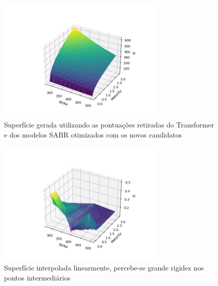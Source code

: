 \begin{figure}
	\begin{center}
		\includegraphics[width=8cm]{resources/pred_surface.png}
		\caption{Superfície gerada utilizando as pontuações retiradas do Transformer e dos modelos SABR otimizados com os novos candidatos}
	\end{center}
\end{figure}

\begin{figure}
	\begin{center}
		\includegraphics[width=8cm]{resources/real_surface.png}
		\caption{Superfície interpolada linearmente, percebe-se grande rigidez nos pontos intermediários}
	\end{center}
\end{figure}
	